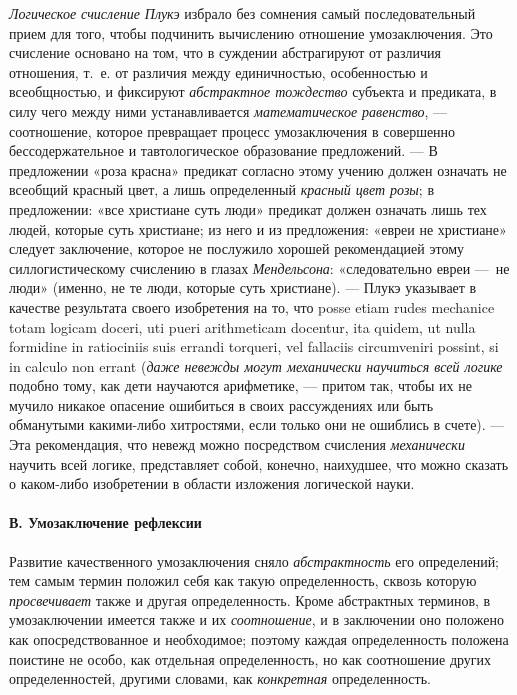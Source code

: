 \documentclass[twoside]{article}
\begin{document}
{{{{{{\em Логическое счисление Плукэ}
избрало без сомнения самый последовательный прием для того,
чтобы подчинить вычислению отношение умозаключения. Это счисление основано
на том, что в суждении абстрагируют от различия отношения, т.~е. от
различия между единичностью, особенностью и всеобщностью, и фиксируют
{\em абстрактное тождество}
субъекта и предиката, в силу чего между ними устанавливается
{\em математическое равенство}, —
соотношение, которое превращает процесс умозаключения в
совершенно бессодержательное и тавтологическое образование предложений. —
В предложении «роза красна» предикат согласно этому учению
должен означать не всеобщий красный цвет, а лишь определенный
{\em красный цвет розы};
в предложении: «все христиане суть люди» предикат должен
означать лишь тех людей, которые суть христиане; из него и из предложения:
«евреи не христиане» следует заключение, которое не послужило хорошей
рекомендацией этому силлогистическому счислению в глазах
{\em Мендельсона}:
«следовательно евреи —~не люди» (именно, не те
люди, которые суть христиане). — Плукэ указывает в качестве
результата своего изобретения на то, что posse etiam rudes mechanice totam
logicam doceri, uti pueri arithmeticam docentur, ita quidem, ut nulla
formidine in ratiociniis suis errandi torqueri, vel fallaciis circumveniri
possint, si in calculo non errant
({\em даже невежды могут механически
научиться всей логике} подобно тому, как дети научаются
арифметике, — притом так, чтобы их не мучило никакое
опасение ошибиться в своих рассуждениях или быть обманутыми какими-либо
хитростями, если только они не ошиблись в счете). — Эта
рекомендация, что невежд можно посредством счисления
{\em механически} научить
всей логике, представляет собой, конечно, наихудшее, что
можно сказать о каком-либо изобретении в области изложения логической
науки.

\paragraph[В. Умозаключение рефлексии]{В. Умозаключение рефлексии}
Развитие качественного умозаключения сняло
{\em абстрактность} его
определений; тем самым термин положил себя как такую определенность, сквозь
которую {\em просвечивает}
также и другая определенность. Кроме абстрактных терминов, в
умозаключении имеется также и их
{\em соотношение}, и в
заключении оно положено как опосредствованное и необходимое; поэтому каждая
определенность положена поистине не особо, как отдельная определенность, но
как соотношение других определенностей, другими словами, как
{\em конкретная} определенность.

}}}}}
\end{document}
